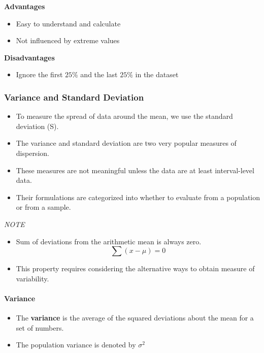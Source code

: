 \documentclass[]{book}
\providecommand{\tightlist}{%
  \setlength{\itemsep}{0pt}\setlength{\parskip}{0pt}}
\let\oldparagraph\paragraph
\renewcommand{\paragraph}[1]{\oldparagraph{#1}\mbox{}}
\begin{document}
\textbf{Advantages}

\begin{itemize}
\tightlist
\item
  Easy to understand and calculate
\item
  Not influenced by extreme values
\end{itemize}

\textbf{Disadvantages}

\begin{itemize}
\tightlist
\item
  Ignore the first \(25\%\) and the last \(25\%\) in the dataset
\end{itemize}

\hypertarget{variance-and-standard-deviation}{%
\subsubsection{Variance and Standard Deviation}\label{variance-and-standard-deviation}}

\begin{itemize}
\tightlist
\item
  To measure the spread of data around the mean, we use the standard deviation (S).
\item
  The variance and standard deviation are two very popular measures of dispersion.
\item
  These measures are not meaningful unless the data are at least interval-level data.
\item
  Their formulations are categorized into whether to evaluate from a population or from a sample.
\end{itemize}

\emph{NOTE}

\begin{itemize}
\item
  Sum of deviations from the arithmetic mean is always zero.
  \[{\sum{(x-\mu)} = 0}\]
\item
  This property requires considering the alternative ways to obtain measure of variability.
\end{itemize}

\hypertarget{variance}{%
\paragraph{Variance}\label{variance}}

\begin{itemize}
\item
  The \textbf{variance} is the average of the squared deviations about the mean for a set of numbers.
\item
  The population variance is denoted by \(\sigma^2\)
\end{itemize}
\end{document}
